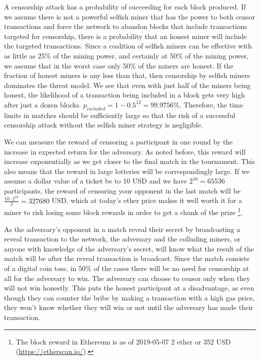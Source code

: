 A censorship attack has a probability of succeeding for each block produced. If we assume there is not a powerful selfish miner that has the power to both censor transactions and force the network to abandon blocks that include transactions targeted for censorship, there is a probability that an honest miner will include the targeted transactions. Since a coalition of selfish miners can be effective with as little as 25\% of the mining power, and certainly at 50\% of the mining power, we assume that in the worst case only 50\% of the miners are honest. If the fraction of honest miners is any less than that, then censorship by selfish miners dominates the threat model. We see that even with just half of the miners being honest, the likelihood of a transaction being included in a block gets very high after just a dozen blocks. $p_{included} = 1-0.5^{12}=99.9756\%$. Therefore, the time limits in matches should be sufficiently large so that the risk of a successful censorship attack without the selfish miner strategy is negligible.

We can measure the reward of censoring a participant in one round by the increase in expected return for the adversary. As noted before, this reward will increase exponentially as we get closer to the final match in the tournament. This also means that the reward in large lotteries will be correspondingly large. If we assume a dollar value of a ticket be to 10 USD and we have $2^{16}=65536$ participants, the reward of censoring your opponent in the last match will be $\frac{10 \cdot 2^{16}}{2}=327680$ USD, which at today's ether price makes it well worth it for a miner to risk losing some block rewards in order to get a chunk of the prize \footnote{The block reward in Ethereum is as of 2019-05-07 2 ether or 352 USD (\url{https://etherscan.io/}).}.

As the adversary's opponent in a match reveal their secret by broadcasting a reveal transaction to the network, the adversary and the colluding miners, or anyone with knowledge of the adversary's secret, will know what the result of the match will be after the reveal transaction is broadcast. Since the match consists of a digital coin toss, in 50\% of the cases there will be no need for censorship at all for the adversary to win. The adversary can choose to censor only when they will not win honestly. This puts the honest participant at a disadvantage, as even though they can counter the bribe by making a transaction with a high gas price, they won't know whether they will win or not until the adversary has made their transaction.

